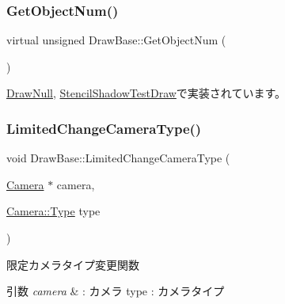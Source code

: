 \mbox{\label{class_draw_base_aed79e9db49de4fa2dff064495b877bcd}} 
\subsubsection{\texorpdfstring{Get\+Object\+Num()}{GetObjectNum()}}
{\footnotesize\ttfamily virtual unsigned Draw\+Base\+::\+Get\+Object\+Num (\begin{DoxyParamCaption}{ }\end{DoxyParamCaption})\hspace{0.3cm}{\ttfamily [pure virtual]}}



\mbox{\hyperlink{class_draw_null_aaffa15d184f1d09512ccaa3bdad3f658}{Draw\+Null}}, \mbox{\hyperlink{class_stencil_shadow_test_draw_a8cc9a54a2bcb1fd006331fca1add02dc}{Stencil\+Shadow\+Test\+Draw}}で実装されています。

\mbox{\label{class_draw_base_aa18abd488181eed72822f92a0f2521fe}} 
\subsubsection{\texorpdfstring{Limited\+Change\+Camera\+Type()}{LimitedChangeCameraType()}}
{\footnotesize\ttfamily void Draw\+Base\+::\+Limited\+Change\+Camera\+Type (\begin{DoxyParamCaption}\item[{\mbox{\hyperlink{class_camera}{Camera}} $\ast$}]{camera,  }\item[{\mbox{\hyperlink{class_camera_a3b0a1f58deca679ac665f61c480d1dcb}{Camera\+::\+Type}}}]{type }\end{DoxyParamCaption})\hspace{0.3cm}{\ttfamily [inline]}}



限定カメラタイプ変更関数 


\begin{DoxyParams}{引数}
{\em camera} & \+: カメラ type \+: カメラタイプ \\
\hline
\end{DoxyParams}
\mbox{\label{class_draw_base_a48b144e61928b7658c7a849017e40c79}} 
